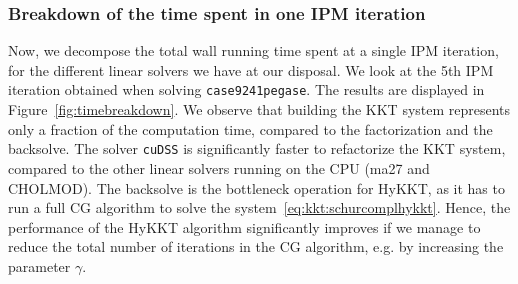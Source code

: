 \begin{table}[!ht]
  \centering
  \caption{Performance of the equality-relaxation
    strategy as we decrease the IPM tolerance $\varepsilon_{tol}$.
    \label{tab:sckkt:performance}.
    The table displays the wall time on the CPU (using CHOLMOD)
    and on the GPU (using cuDSS). We display the
    relative errors on the objective $\delta_{obj} = (f(x_{hsl}^\sharp) - f(x_{sc}^\sharp))/f(x_{hsl}^\sharp)$
    and on the primal solution $\delta_x = \|x_{hsl}^\sharp - x_{sc}^\sharp\|_\infty
    / \|x_{hsl}^\sharp\|_\infty$. (A30 GPU)
  }
\end{table}


\subsubsection{Breakdown of the time spent in one IPM iteration}
Now, we decompose the total wall running time spent at a single
IPM iteration, for the different linear solvers we have at our disposal.
We look at the 5th IPM iteration obtained when solving {\tt case9241pegase}.
The results are displayed in Figure~\ref{fig:timebreakdown}. We observe
that building the KKT system represents only a fraction of the computation time, compared
to the factorization and the backsolve. The solver {\tt cuDSS} is significantly
faster to refactorize the KKT system, compared to the other linear solvers running on the CPU (ma27 and CHOLMOD).
The backsolve is the bottleneck operation for HyKKT, as it has to run a
full CG algorithm to solve the system~\eqref{eq:kkt:schurcomplhykkt}. Hence, the performance
of the HyKKT algorithm significantly improves if we manage to reduce the total
number of iterations in the CG algorithm, e.g. by increasing the parameter $\gamma$.

